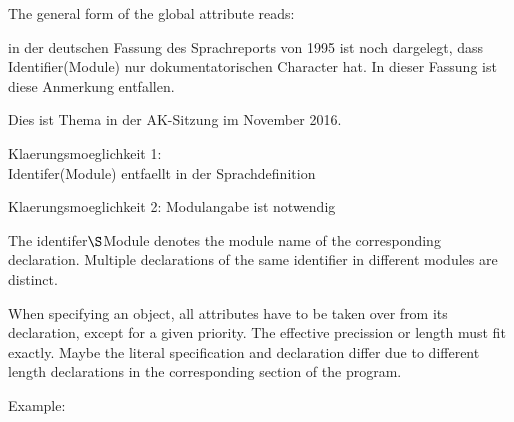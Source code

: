The general form of the global attribute reads:


\begin{discuss}
in der deutschen Fassung des Sprachreports von 1995 ist noch dargelegt,
dass Identifier(Module) nur dokumentatorischen Character hat.
In dieser Fassung ist diese Anmerkung entfallen.

Dies ist Thema in der AK-Sitzung im November 2016.

Klaerungsmoeglichkeit 1:\\
Identifer(Module) entfaellt in der Sprachdefinition

Klaerungsmoeglichkeit 2: Modulangabe ist notwendig\\
\begin{added}
The identifer$\S $Module denotes the module name of the corresponding
declaration. Multiple declarations of the same identifier in different modules
are distinct.
\end{added}  
\end{discuss}



When specifying an object, all attributes have to be taken over from its
declaration, except for a given priority. 
The effective precission or length 
must fit exactly. Maybe the literal specification and declaration differ 
due to different length declarations
 in the corresponding section of the program.


Example:



